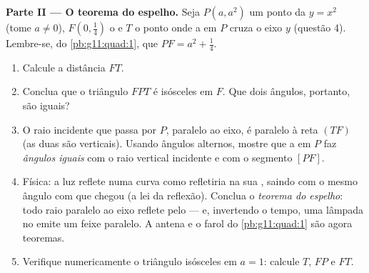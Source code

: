 \begin{problem}
\medskip
\noindent\textbf{Parte II --- O teorema do espelho.}
Seja $P(a, a^2)$ um ponto da  $y = x^2$ (tome
$a \neq 0$), $F\left(0, \frac14\right)$ o  e $T$ o ponto onde
a  em $P$ cruza o eixo $y$ (questão 4). Lembre-se, do
\cref{pb:g11:quad:1}, que $PF = a^2 + \frac14$.
\begin{enumerate}[resume]
  \item Calcule a distância $FT$.
  \item Conclua que o triângulo $FPT$ é isósceles em $F$. Que
        dois ângulos, portanto, são iguais?
  \item O raio incidente que passa por $P$, paralelo ao eixo, é
        paralelo à reta $(TF)$ (as duas são verticais). Usando
        ângulos alternos, mostre que a  em $P$ faz
        \emph{ângulos iguais} com o raio vertical incidente e com
        o segmento $[PF]$.
  \item Física: a luz reflete numa curva como refletiria na sua
        , saindo com o mesmo ângulo com que chegou (a lei
        da reflexão). Conclua o \emph{teorema do espelho}: todo
        raio paralelo ao eixo reflete pelo  --- e, invertendo
        o tempo, uma lâmpada no  emite um feixe paralelo. A
        antena e o farol do \cref{pb:g11:quad:1} são agora
        teoremas.
  \item Verifique numericamente o triângulo isósceles em $a = 1$:
        calcule $T$, $FP$ e $FT$.
\end{enumerate}


\end{problem}
